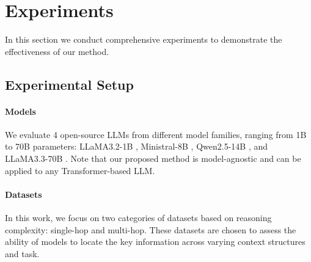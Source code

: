 \section{Experiments}
\label{sec:experiments}
In this section we conduct comprehensive experiments to demonstrate the effectiveness of our method. 
\subsection{Experimental Setup}
\paragraph{Models}
We evaluate 4 open-source LLMs from different model families, ranging from 1B to 70B parameters: LLaMA3.2-1B \citep{dubey2024llama}, Ministral-8B \citep{mistral}, Qwen2.5-14B \citep{qwen2}, and LLaMA3.3-70B \citep{dubey2024llama}. Note that our proposed method is model-agnostic and can be applied to any Transformer-based LLM.


\paragraph{Datasets}
\label{sec:data}
In this work, we focus on two categories of datasets based on reasoning complexity: single-hop and multi-hop. These datasets are chosen to assess the ability of models to locate the key information across varying context structures and task.

